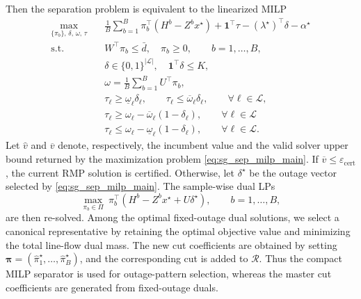 \hspace*{0.7em}Then the separation problem is equivalent to the linearized MILP
\begin{equation}
\label{eq:sg_sep_milp_main}
\begin{aligned}
\max_{\{\pi_b\},\,\delta,\,\omega,\,\tau}\quad
&\frac{1}{B}\sum_{b=1}^B \pi_b^\top(H^b-Z^b x^{\star})
+\mathbf{1}^\top\tau
-(\lambda^{\star})^\top\delta
-\alpha^{\star}\\
\text{s.t.}\quad
&W^\top\pi_b\le \bar d,\quad \pi_b\ge 0,\qquad b=1,\dots,B,\\
&\delta\in\{0,1\}^{|\mathcal{L}|},\quad \mathbf{1}^\top\delta\le K,\\
&\omega=\frac{1}{B}\sum_{b=1}^B U^\top\pi_b,\\
&\tau_{\ell}\ge \underline{\omega}_{\ell}\delta_{\ell},\qquad
\tau_{\ell}\le \overline{\omega}_{\ell}\delta_{\ell},\qquad \forall \ell\in\mathcal{L},\\
&\tau_{\ell}\ge \omega_{\ell}-\overline{\omega}_{\ell}(1-\delta_{\ell}),\qquad \forall \ell\in\mathcal{L}\\
&\tau_{\ell}\le \omega_{\ell}-\underline{\omega}_{\ell}(1-\delta_{\ell}),\qquad \forall \ell\in\mathcal{L}.
\end{aligned}
\end{equation}
\hspace*{0.7em}Let $\widehat v$ and $\overline v$ denote, respectively, the incumbent value
and the valid solver upper bound returned by the maximization problem
\eqref{eq:sg_sep_milp_main}. If $\overline v\le
\varepsilon_{\mathrm{cert}}$, the current RMP solution is certified. Otherwise,
let $\delta^{\star}$ be the outage vector selected by
\eqref{eq:sg_sep_milp_main}. The sample-wise dual LPs
\[
\max_{\pi_b\in\Pi}\ \pi_b^\top(H^b-Z^b x^{\star}+U\delta^{\star}),
\qquad b=1,\dots,B,
\]
are then re-solved. Among the optimal fixed-outage dual solutions, we select a
canonical representative by retaining the optimal objective value and minimizing
the total line-flow dual mass. The new cut coefficients are obtained by setting
$\boldsymbol{\pi}=(\widehat{\pi}_1^{\star},\dots,\widehat{\pi}_B^{\star})$, and
the corresponding cut is added to $\mathcal{R}$. Thus the compact MILP
separator is used for outage-pattern selection, whereas the master cut
coefficients are generated from fixed-outage duals.

